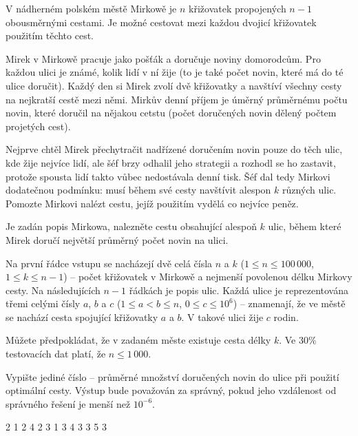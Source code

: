





V nádherném polském městě Mirkowě je $n$ křižovatek propojených $n - 1$
obousměrnými cestami.
Je možné cestovat mezi každou dvojicí křižovatek použitím těchto cest.

Mirek v Mirkowě pracuje jako pošťák a doručuje noviny domorodcům.
Pro každou ulici je známé, kolik lidí v ní žije
(to je také počet novin, které má do té ulice doručit).
Každý den si Mirek zvolí dvě křižovatky a navštíví všechny cesty na nejkratší
cestě mezi němi. Mirkův denní příjem je úměrný průměrnému počtu novin, které
doručil na nějakou cetstu
(počet doručených novin dělený počtem projetých cest).

Nejprve chtěl Mirek přechytračit nadřízené doručením novin pouze do těch ulic,
kde žije nejvíce lidí, ale šéf brzy odhalil jeho strategii a rozhodl se ho zastavit,
protože spousta lidí takto vůbec nedostávala denní tisk.
Šéf dal tedy Mirkovi dodatečnou podmínku: musí během své cesty navštívit
alespon $k$ různých ulic.
Pomozte Mirkovi nalézt cestu, jejíž použitím vydělá co nejvíce peněz.


Je zadán popis Mirkowa, nalezněte cestu obsahující alespoň $k$ ulic,
během které Mirek doručí největší průměrný počet novin na ulici.


Na první řádce vstupu se nacházejí dvě celá čísla $n$ a $k$
($1 \le n \le 100\,000$, $1 \le k \le n - 1$)
-- počet křižovatek v Mirkowě a nejmenší povolenou délku Mirkovy cesty.
Na následujících $n-1$ řádkách je popis ulic.
Každá ulice je reprezentována třemi celými čísly $a$, $b$ a $c$
($1 \le a < b \le n$, $0 \le c \le 10^6$)
-- znamenají, že ve městě se nachází cesta spojující křižovatky $a$ a $b$. V takové ulici žije $c$ rodin.

Můžete předpokládat, že v zadaném měste existuje cesta délky $k$.
\smallskip
Ve $30\%$ testovacích dat platí, že  $n \le 1\,000$.


Vypište jediné číslo -- průměrné množství doručených novin do ulice při použití
optimální cesty.
Výstup bude považován za správný, pokud jeho vzdálenost od správného řešení
je menší než $10^{-6}$.


 2
1 2 4
2 3 1
3 4 3
3 5 3
\sampleEND



